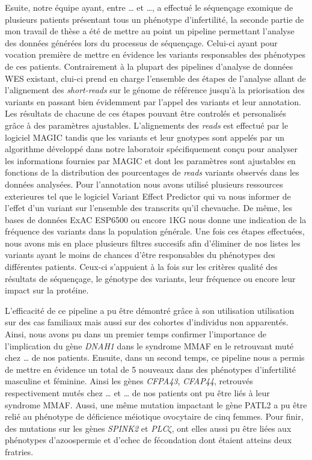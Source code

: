 \documentclass[12pt,twoside]{reedthesis}
\theoremstyle{definition}
\theoremstyle{definition}
\theoremstyle{remark}
\begin{document}
  Esuite, notre équipe ayant, entre \ldots{} et \ldots{}, a effectué le
  séquençage exomique de plusieurs patients présentant tous un phénotype
  d'infertilité, la seconde partie de mon travail de thèse a été de mettre
  au point un pipeline permettant l'analyse des données générées lors du
  processus de séquençage. Celui-ci ayant pour vocation première de mettre
  en évidence les variants responsables des phénotypes de ces patients.
  Contrairement à la plupart des pipelines d'analyse de données WES
  existant, clui-ci prend en charge l'ensemble des étapes de l'analyse
  allant de l'alignement des \emph{short-reads} sur le génome de référence
  jusqu'à la priorisation des variants en passant bien évidemment par
  l'appel des variants et leur annotation. Les résultats de chacune de ces
  étapes pouvant être controlés et personalisés grâce à des paramètres
  ajustables. L'alignements des \emph{reads} est effectué par le logiciel
  MAGIC tandis que les variants et leur gnotypes sont appelés par un
  algorithme développé dans notre laboratoir spécifiquement conçu pour
  analyser les informations fournies par MAGIC et dont les paramètres sont
  ajustables en fonctions de la distribution des pourcentages de
  \emph{reads} variants observés dans les données analysées. Pour
  l'annotation nous avons utilisé plusieurs ressources exterieures tel que
  le logiciel Variant Effect Predictor qui va nous informer de l'effet
  d'un variant sur l'ensemble des transcrits qu'il chevauche. De même, les
  bases de données ExAC ESP6500 ou encore 1KG nous donne une indication de
  la fréquence des variants dans la population générale. Une fois ces
  étapes effectuées, nous avons mis en place plusieurs filtres succesifs
  afin d'éliminer de nos listes les variants ayant le moins de chances
  d'être responsables du phénotypes des différentes patients. Ceux-ci
  s'appuient à la fois sur les critères qualité des résultats de
  séquençage, le génotype des variants, leur fréquence ou encore leur
  impact sur la protéine.
  
  L'efficacité de ce pipeline a pu être démontré grâce à son utilisation
  utilisation sur des cas familiaux mais aussi sur des cohortes
  d'individus non apparentés. Ainsi, nous avons pu dans un premier temps
  confirmer l'importance de l'implication du gène \emph{DNAH1} dans le
  syndrome MMAF en le retrouvant muté chez \ldots{} de nos patients.
  Ensuite, dans un second temps, ce pipeline nous a permis de mettre en
  évidence un total de 5 nouveaux dans des phénotypes d'infertilité
  masculine et féminine. Ainsi les gènes \emph{CFPA43}, \emph{CFAP44},
  retrouvés respectivement mutés chez \ldots{} et \ldots{} de nos patients
  ont pu être liés à leur syndrome MMAF. Aussi, une même mutation
  impactant le gène PATL2 a pu être relié au phénotype de déficience
  méiotique ovocytaire de cinq femmes. Pour finir, des mutations sur les
  gènes \emph{SPINK2} et \emph{PLC}\(\zeta\), ont elles aussi pu être
  liées aux phénotypes d'azoospermie et d'echec de fécondation dont
  étaient atteins deux fratries.
  
\end{document}
